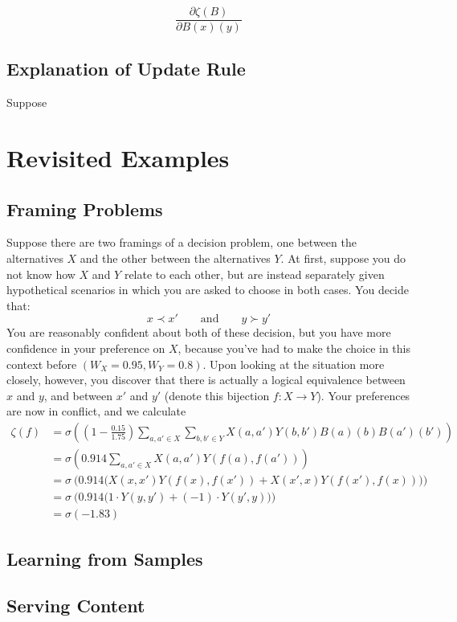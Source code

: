 \documentclass{article}
\begin{document}
	\[ \frac{\partial \zeta(B) }{\partial B(x)(y) } \]
	
	\subsection{Explanation of Update Rule}
	Suppose 
	
		
	\section{Revisited Examples}
	
	\subsection{Framing Problems}
	Suppose there are two framings of a decision problem, one between the alternatives $X$ and the other between the alternatives $Y$. At first, suppose you do not know how $X$ and $Y$ relate to each other, but are instead separately given hypothetical scenarios in which you are asked to choose in both cases. You decide that:	
	\[ x \prec x' \qquad\text{and}\qquad y \succ y' \]
	You are reasonably confident about both of these decision, but you have more confidence in your preference on $X$, because you've had to make the choice in this context before $(W_X = 0.95, W_Y=0.8)$. Upon looking at the situation more closely, however, you discover that there is actually a logical equivalence between $x$ and $y$, and between $x'$ and $y'$ (denote this bijection $f : X\to Y$). Your preferences are now in conflict, and we calculate
	\begin{align*}
		\zeta(f) &= \sigma \left( \left(1- \frac{0.15}{1.75}\right) \sum_{a,a' \in X}\sum_{b,b' \in Y} X(a,a') Y(b,b') B(a)(b) B(a')(b') \right) \\
		&= \sigma \left( 0.914 \sum_{a,a' \in X} X(a,a') Y(f(a), f(a'))  \right) \\
		&= \sigma~ \bigg( 0.914 \Big(  X(x,x') Y(f(x), f(x')) + X(x',x) Y(f(x'), f(x))  \Big) \bigg) \\
		&= \sigma~ \bigg( 0.914 \Big(  1 \cdot Y(y, y') + (-1) \cdot Y(y', y)  \Big) \bigg) \\
		&= \sigma (-1.83)
	\end{align*}
	
	
	\subsection{Learning from Samples}	
	\subsection{Serving Content}
	
\end{document}
